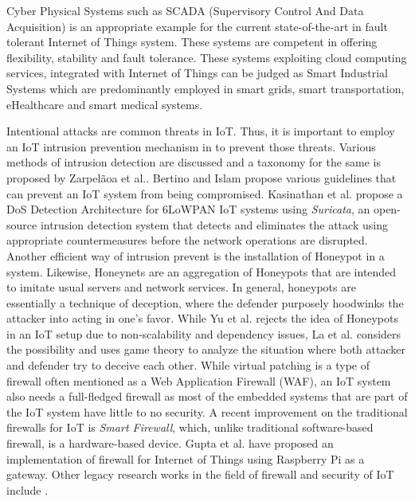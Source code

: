 Cyber Physical Systems such as SCADA (Supervisory Control And Data Acquisition) is an appropriate example for the current state-of-the-art in fault tolerant Internet of Things system\cite{Sajid2016}. These systems are competent in offering flexibility, stability and fault tolerance. These systems exploiting cloud computing services, integrated with Internet of Things can be judged as Smart Industrial Systems which are predominantly employed in smart grids, smart transportation, eHealthcare and smart medical systems.

Intentional attacks are common threats in IoT. Thus, it is important to employ an IoT intrusion prevention mechanism in to prevent those threats. Various methods of intrusion detection are discussed and a taxonomy for the same is proposed by Zarpelãoa et al.\cite{Zarpelao2017}. Bertino and Islam\cite{Bertino2017} propose various guidelines that can prevent an IoT system from being compromised. Kasinathan et al.\cite{Kasinathan2013} propose a DoS Detection Architecture for 6LoWPAN IoT systems using \textit{Suricata}, an open-source intrusion detection system that detects and eliminates the attack using appropriate countermeasures before the network operations are disrupted. Another efficient way of intrusion prevent is the installation of Honeypot in a system. Likewise, Honeynets are an aggregation of Honeypots that are intended to imitate usual servers and network services\cite{Provos2008}. In general, honeypots are essentially a technique of deception, where the defender purposely hoodwinks the attacker into acting in one’s favor\cite{Daniel1982}. While Yu et al.\cite{Yu2015} rejects the idea of Honeypots in an IoT setup due to non-scalability and dependency issues, La et al.\cite{La2016} considers the possibility and uses game theory to analyze the situation where both attacker and defender try to deceive each other. 
While virtual patching is a type of firewall often mentioned as a Web Application Firewall (WAF), an IoT system also needs a full-fledged firewall as most of the embedded systems that are part of the IoT system have little to no security. A recent improvement on the traditional firewalls for IoT is \textit{Smart Firewall}, which, unlike traditional software-based firewall, is a hardware-based device\cite{Colburn2017}. Gupta et al.\cite{Gupta2017} have proposed an implementation of firewall for Internet of Things using Raspberry Pi as  a gateway. Other legacy research works in the field of firewall and security of IoT include \cite{Brachmann2012,Altolini2013,Babar2011,Babar2010}.
